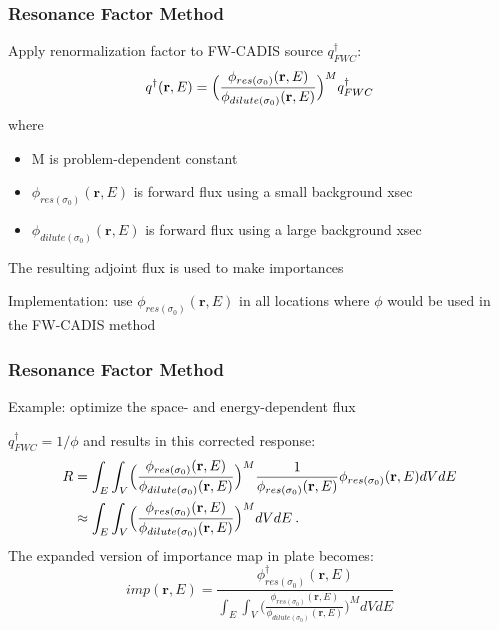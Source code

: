 \documentclass[xcolor=x11names,compress]{beamer}
\renewcommand{\(}{\begin{columns}}
\renewcommand{\)}{\end{columns}}
\newcommand{\<}[1]{\begin{column}{#1}}
\renewcommand{\>}{\end{column}}
\newcommand{\ve}[1]{\ensuremath{\mathbf{#1}}}
\newcommand{\micro}{\ensuremath{\sigma}}
\begin{document}
\begin{frame}[fragile]
  \frametitle{Resonance Factor Method}
  	Apply renormalization factor to FW-CADIS source $q^{\dagger}_{FWC}$: 
	\begin{equation}
   	q^{\dagger}(\ve{r},E) = \Bigl(\frac{\phi_{res(\micro_0)}(\ve{r},E)}{\phi_{dilute(\micro_0)}(\ve{r},E)}\Bigr)^M q^{\dagger}_{FWC} 
  	 \label{eq:newQ}
	\end{equation}
	where
	\begin{itemize}
  	\item M is problem-dependent constant 
 	 \item $\phi_{res(\micro_0)}(\ve{r},E)$ is forward flux using a small background xsec
 	 \item $\phi_{dilute(\micro_0)}(\ve{r},E)$ is forward flux using a large background xsec
	\end{itemize}
	
	The resulting adjoint flux is used to make importances
	\vspace*{1 em}
	
	Implementation: use $\phi_{res(\micro_0)}(\ve{r},E)$  in all locations where $\phi$ would be used in the FW-CADIS method
	
	
	
\end{frame}

\begin{frame}[fragile]
  \frametitle{Resonance Factor Method}
  
	Example: optimize the space- and energy-dependent flux
	
	\vspace*{1 em}
	$q^{\dagger}_{FWC} = 1 / \phi$ and results in this corrected response: 
	\begin{align}
 	R &= \int_E \int_{V} \Bigl(\frac{\phi_{res(\micro_0)}(\ve{r},E)}{\phi_{dilute(\micro_0)}(\ve{r},E)}\Bigr)^M \frac{1}{\phi_{res(\micro_0)}(\ve{r}, E)} \phi_{res(\micro_0)}(\ve{r}, E) dV dE \nonumber
 	\label{eq:newResponse} \\
  	 &\approx \int_E \int_{V} \Bigl(\frac{\phi_{res(\micro_0)}(\ve{r},E)}{\phi_{dilute(\micro_0)}(\ve{r},E)}\Bigr)^M dV dE \:. \nonumber
	\end{align}
	The expanded version of importance map in plate becomes:
	\begin{equation}
 imp(\ve{r},E)= \frac{\phi_{res(\micro_0)}^{\dagger}(\ve{r},E)}{\int_E \int_{V} \bigl(\frac{\phi_{res(\micro_0)}(\ve{r},E)}{\phi_{dilute(\micro_0)}(\ve{r},E)}\bigr)^M dV dE}
 	 \label{eq:newImp}
	\end{equation}  
  
\end{frame}
\end{document}

